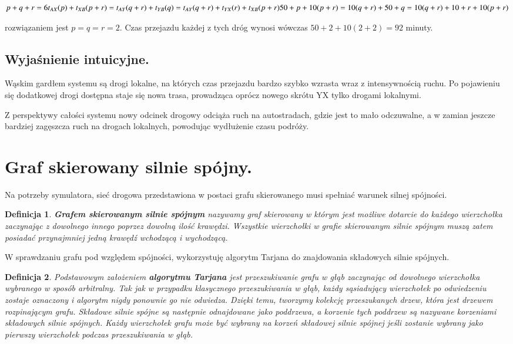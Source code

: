 \documentclass[twoside,12pt]{report}
\newtheorem{definition}{Definicja} %
\begin{document}
\begin{center}
\begin{math}
p+q+r = 6 \newline
t_{AX}(p)+t_{XB}(p+r) = t_{AY}(q+r) + t_{YB}(q) = t_{AY}(q+r)+t_{YX}(r)+t_{XB}(p+r)\newline
50+p+10(p+r) = 10(q+r)+50+q = 10(q+r)+ 10 + r + 10(p+r)\newline
\end{math}
\end{center}
rozwiązaniem jest $p=q=r=2$.
Czas przejazdu każdej z tych dróg wynosi wówczas $50+2+10(2+2)=92$ minuty.

\subsection{Wyjaśnienie intuicyjne.}
Wąskim gardłem systemu są drogi lokalne, na których czas przejazdu bardzo szybko wzrasta wraz z intensywnością ruchu. Po pojawieniu się dodatkowej drogi dostępna staje się nowa trasa, prowadząca oprócz nowego skrótu YX tylko drogami lokalnymi.

Z perspektywy całości systemu nowy odcinek drogowy odciąża ruch na autostradach, gdzie jest to mało odczuwalne, a w zamian jeszcze bardziej zagęszcza ruch na drogach lokalnych, powodując wydłużenie czasu podróży.

\section{Graf skierowany silnie spójny.}
Na potrzeby symulatora, sieć drogowa przedstawiona w postaci grafu skierowanego musi spełniać warunek silnej spójności. 
\newline
\begin{definition}\label{Graf silnie spójny}
\textbf{Grafem skierowanym silnie spójnym} nazywamy graf skierowany w którym jest możliwe dotarcie do każdego wierzchołka zaczynając z dowolnego innego poprzez dowolną ilość krawędzi. Wszystkie wierzchołki w grafie skierowanym silnie spójnym muszą zatem posiadać przynajmniej jedną krawędź wchodzącą i wychodzącą\cite{silniespojny}.
\end{definition}

W sprawdzaniu grafu pod względem spójności, wykorzystuję algorytm Tarjana do znajdowania składowych silnie spójnych.
\newline
\begin{definition}\label{Algorytm Tarjana}
Podstawowym założeniem \textbf{algorytmu Tarjana} jest przeszukiwanie grafu w głąb zaczynając od dowolnego wierzchołka wybranego w sposób arbitralny. Tak jak w przypadku klasycznego przeszukiwania w głąb, każdy sąsiadujący wierzchołek po odwiedzeniu zostaje oznaczony i algorytm nigdy ponownie go nie odwiedza. Dzięki temu, tworzymy kolekcję przeszukanych drzew, która jest drzewem rozpinającym grafu. Składowe silnie spójne są następnie odnajdowane jako poddrzewa, a korzenie tych poddrzew są nazywane korzeniami składowych silnie spójnych. Każdy wierzchołek grafu może być wybrany na korzeń składowej silnie spójnej jeśli zostanie wybrany jako pierwszy wierzchołek podczas przeszukiwania w głąb.
\end{definition}
\end{document}
